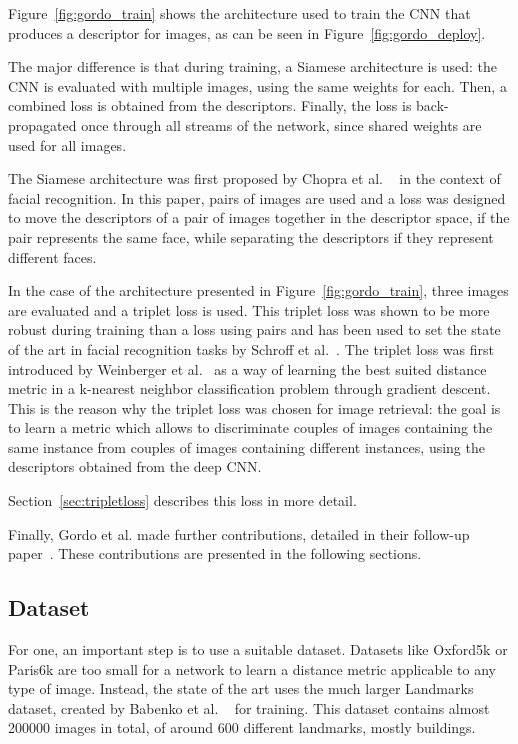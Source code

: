Figure~\ref{fig:gordo_train} shows the architecture used to train the CNN
that produces a descriptor for images, as can be seen in
Figure~\ref{fig:gordo_deploy}.

The major difference is that during training, a Siamese architecture is
used: the CNN is evaluated with multiple images, using the same weights
for each. Then, a combined loss is obtained from the descriptors.
Finally, the loss is back-propagated once through all streams of the network,
since shared weights are used for all images.

The Siamese architecture was first proposed by Chopra et al.
~\cite{chopra_learning_2005} in the context of facial recognition.
In this paper, pairs of images are used and a loss was designed to
move the descriptors of a pair of images together in the descriptor space,
if the pair represents the same face, while separating the descriptors
if they represent different faces.

In the case of the architecture presented in Figure~\ref{fig:gordo_train},
three images are evaluated and a triplet loss is used.
This triplet loss was shown to be more robust during training than a
loss using pairs and has been used to set the state of the art
in facial recognition tasks by Schroff et al.~\cite{schroff_facenet:_2015}.
The triplet loss was first introduced by
Weinberger et al.~\cite{weinberger_distance_2006} as a way of learning
the best suited distance metric in a k-nearest neighbor classification
problem through gradient descent.
This is the reason why the triplet loss was chosen for image retrieval:
the goal is to learn a metric which allows to discriminate couples of
images containing the same instance from couples of images containing
different instances, using the descriptors obtained from the deep
CNN.

Section~\ref{sec:tripletloss} describes this loss in more detail.

Finally, Gordo et al. made further contributions, detailed in their
follow-up paper~\cite{gordo_end--end_2017}. These contributions are
presented in the following sections.

\subsection{Dataset}
For one, an important step is to use a suitable dataset. Datasets like
Oxford5k or Paris6k are too small for a network to learn a distance metric
applicable to any type of image. Instead, the state of the art uses the
much larger Landmarks dataset, created by Babenko et al.
~\cite{babenko_neural_2014} for training.
This dataset contains almost 200000 images in total, of around 600
different landmarks, mostly buildings.

